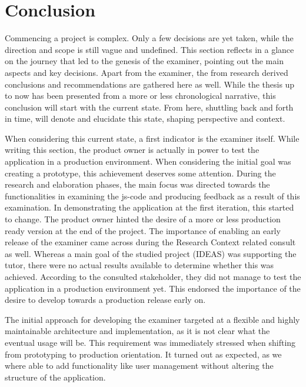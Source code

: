 \chapter{Conclusion}

Commencing a project is complex. Only a few decisions are yet taken, while
the direction and scope is still vague and undefined. This section reflects in a 
glance on the journey that led to the genesis of the \gls{examiner}, pointing 
out the main aspects and key decisions. Apart from the \gls{examiner}, the from 
research derived conclusions and recommendations are gathered here as well. 
While the thesis up to now has been presented from a more or less chronological
narrative, this conclusion will start with the current state. From
here, shuttling back and forth in time, will denote and elucidate this state,
shaping perspective and context.


When considering this current state, a first indicator is the \gls{examiner}
itself. While writing this section, the product owner is actually in power to
test the application in a production environment. When considering the
initial goal was creating a prototype, this achievement deserves some attention.
During the research and elaboration phases, the main focus was directed towards 
the functionalities in examining the \gls{js-code} and producing \gls{feedback}
as a result of this examination. In demonstrating the application at the
first iteration, this started to change. The product owner hinted the desire of
a more or less production ready version at the end of the project. The 
importance of enabling an early release of the \gls{examiner} came across
during the Research Context related consult as well. Whereas a main goal of the
studied project (IDEAS) was supporting the \gls{tutor}, there were no actual
results available to determine whether this was achieved. According to the
consulted stakeholder, they did not manage to test the application in a 
production environment yet. This endorsed the importance of the desire to 
develop towards a production release early on.


The initial approach for developing the \gls{examiner} targeted at a flexible
and highly maintainable architecture and implementation, as it is not clear
what the eventual usage will be. This requirement was immediately stressed
when shifting from prototyping to production orientation. It turned out as
expected, as we where able to add functionality like user management without 
altering the structure of the application.


